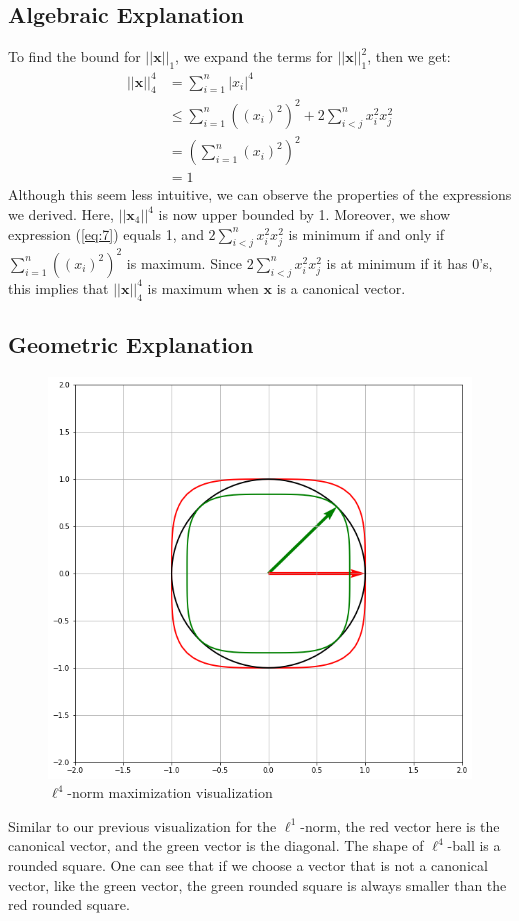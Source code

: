 \documentclass[11pt]{article}
\begin{document}
\subsection{Algebraic Explanation}
	To find the bound for $||\bm{x}||_1$, we expand the terms for $||\bm{x}||_1^2$, then we get:
	\begin{align}
    	||\bm{x}||_4^4 
    		&= \sum^{n}_{i=1} |x_{i}|^{4} \\
			&\leq \sum^{n}_{i=1} ((x_{i})^{2})^{2} + 2\sum^{n}_{i<j} x_{i}^{2}x_{j}^{2}\label{eq:7}\\
			&= (\sum^{n}_{i=1} (x_{i})^2)^{2} \\
			&= 1
	\end{align}
	Although this seem less intuitive, we can observe the properties of the expressions we derived. Here, $||\bm{x}_{4}||^{4}$
	is now upper bounded by 1. Moreover, we show expression (\ref{eq:7}) equals 1, and $2\sum^{n}_{i<j} x_{i}^{2}x_{j}^{2}$
	is minimum if and only if $\sum^{n}_{i=1} ((x_{i})^{2})^{2}$ is maximum. Since $2\sum^{n}_{i<j} x_{i}^{2}x_{j}^{2}$ is at minimum 
	if it has 0's, this implies that $||\bm{x}||_4^4$ is maximum when $\bm{x}$ is a canonical vector. 
	

\subsection{Geometric Explanation}
    \begin{figure}[h]
        \centering
        \includegraphics[scale=0.4]{l4norm_bound.png}
        \caption{$\ell^{4}$-norm maximization visualization}
        \label{fig:l4_bound}
    \end{figure}
    Similar to our previous visualization for the $\ell^{1}$-norm, the red vector here is the canonical vector, and the green 
    vector is the diagonal. The shape of $\ell^{4}$-ball is a rounded square. One can see that if we choose a vector that is not 
    a canonical vector, like the green vector, the green rounded square is always smaller than the red rounded square. 
    
\end{document}
